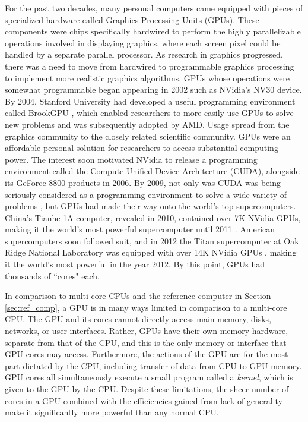 For the past two decades, many personal computers came
equipped with pieces of specialized hardware called
Graphics Processing Units (GPUs).
These components were chips specifically hardwired to
perform the highly parallelizable operations involved
in displaying graphics, where each screen pixel could be handled
by a separate parallel processor.
As research in graphics progressed, there was a need to
move from hardwired to programmable graphics processing
to implement more realistic graphics algorithms.
GPUs whose operations were somewhat programmable began appearing
in 2002 such as NVidia's NV30 device.
By 2004, Stanford University had developed a useful programming
environment called BrookGPU \cite{buck2004brook}, which
enabled researchers to more easily use GPUs to solve new problems
and was subsequently adopted by AMD.
Usage spread from the graphics community to the closely
related scientific community.
GPUs were an affordable personal solution for researchers
to access substantial computing power.
The interest soon motivated NVidia to release a programming
environment called the Compute Unified Device Architecture (CUDA),
alongside its GeForce 8800 products in 2006.
By 2009, not only was CUDA was being seriously considered as a programming
environment to solve a wide variety of problems \cite{hwu2009compute},
but GPUs had made their way onto the world's top supercomputers.
China's Tianhe-1A computer, revealed in 2010,
contained over 7K NVidia GPUs, making it the world's
most powerful supercomputer until 2011 \cite{yang2011tianhe}.
American supercomputers soon followed suit, and in 2012
the Titan supercomputer at Oak Ridge National Laboratory
was equipped with over 14K NVidia GPUs \cite{bland2012titan},
making it the world's most powerful in the year 2012.
By this point, GPUs had thousands of ``cores" each.

In comparison to multi-core CPUs and the reference computer
in Section \ref{sec:ref_comp},
a GPU is in many ways limited in comparison to a multi-core CPU.
The GPU and its cores cannot directly access main memory,
disks, networks, or user interfaces.
Rather, GPUs have their own memory hardware, separate from that of the CPU,
and this is the only memory or interface that GPU cores may access.
Furthermore, the actions of the GPU are for the most part dictated
by the CPU, including transfer of data from CPU to GPU memory.
GPU cores all simultaneously execute a small program called a \emph{kernel},
which is given to the GPU by the CPU.
Despite these limitations, the sheer number of cores in a GPU
combined with the efficiencies gained from lack of generality
make it significantly more powerful than any normal CPU.

